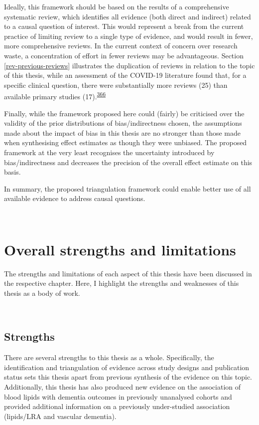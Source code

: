 \documentclass[a4paper, twoside]{templates/ociamthesis}
\begin{document}
Ideally, this framework should be based on the results of a comprehensive systematic review, which identifies all evidence (both direct and indirect) related to a causal question of interest. This would represent a break from the current practice of limiting review to a single type of evidence, and would result in fewer, more comprehensive reviews. In the current context of concern over research waste, a concentration of effort in fewer reviews may be advantageous. Section \ref{rev-previous-reviews} illustrates the duplication of reviews in relation to the topic of this thesis, while an assessment of the COVID-19 literature found that, for a specific clinical question, there were substantially more reviews (25) than available primary studies (17).\textsuperscript{\protect\hyperlink{ref-perez-gaxiola2021}{366}}

Finally, while the framework proposed here could (fairly) be criticised over the validity of the prior distributions of bias/indirectness chosen, the assumptions made about the impact of bias in this thesis are no stronger than those made when synthesising effect estimates as though they were unbiased. The proposed framework at the very least recognises the uncertainty introduced by bias/indirectness and decreases the precision of the overall effect estimate on this basis.

In summary, the proposed triangulation framework could enable better use of all available evidence to address causal questions.

~

\hypertarget{overall-strengths-and-limitations}{%
\section{Overall strengths and limitations}\label{overall-strengths-and-limitations}}

The strengths and limitations of each aspect of this thesis have been discussed in the respective chapter. Here, I highlight the strengths and weaknesses of this thesis as a body of work.

~

\hypertarget{strengths-3}{%
\subsection{Strengths}\label{strengths-3}}

There are several strengths to this thesis as a whole. Specifically, the identification and triangulation of evidence across study designs and publication status sets this thesis apart from previous synthesis of the evidence on this topic. Additionally, this thesis has also produced new evidence on the association of blood lipids with dementia outcomes in previously unanalysed cohorts and provided additional information on a previously under-studied association (lipids/LRA and vascular dementia).
\end{document}
